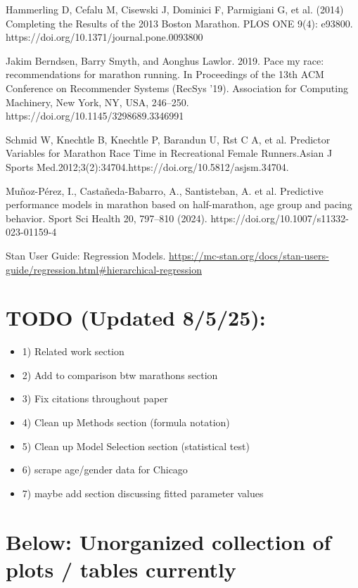 \documentclass[USenglish,twocolumn]{article}
\theoremstyle{dgthm}
\theoremstyle{dgdef}
\begin{document}
\begin{thebibliography}{9}
Hammerling D, Cefalu M, Cisewski J, Dominici F, Parmigiani G, et al. (2014) Completing the Results of the 2013 Boston Marathon. PLOS ONE 9(4): e93800. https://doi.org/10.1371/journal.pone.0093800

Jakim Berndsen, Barry Smyth, and Aonghus Lawlor. 2019. Pace my race: recommendations for marathon running. In Proceedings of the 13th ACM Conference on Recommender Systems (RecSys '19). Association for Computing Machinery, New York, NY, USA, 246–250. https://doi.org/10.1145/3298689.3346991

Schmid W, Knechtle B, Knechtle P, Barandun U, Rst C A, et al. Predictor Variables for Marathon Race Time in Recreational Female Runners.Asian J Sports Med.2012;3(2):34704.https://doi.org/10.5812/asjsm.34704.

Muñoz-Pérez, I., Castañeda-Babarro, A., Santisteban, A. et al. Predictive performance models in marathon based on half-marathon, age group and pacing behavior. Sport Sci Health 20, 797–810 (2024). https://doi.org/10.1007/s11332-023-01159-4

Stan User Guide: Regression Models. \url{https://mc-stan.org/docs/stan-users-guide/regression.html#hierarchical-regression}

\end{thebibliography}


\section{TODO (Updated 8/5/25):}
\begin{itemize}
	\item 1) Related work section
	\item 2) Add to comparison btw marathons section
	\item 3) Fix citations throughout paper
	\item 4) Clean up Methods section (formula notation)
	\item 5) Clean up Model Selection section (statistical test)
	\item 6) scrape age/gender data for Chicago
	\item 7) maybe add section discussing fitted parameter values
\end{itemize}

\appendix
\section{Below: Unorganized collection of plots / tables currently}
\end{document}
